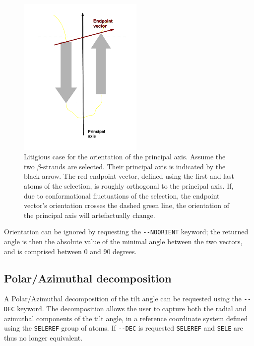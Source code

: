 \documentclass[11pt,twoside,onecolumn,a4paper,openright,notitlepage]{book}[2001/04/21]
\begin{document}
\begin{figure}[h]
\centering
\includegraphics[width=6cm]{images/error-beta-sheet.pdf}
\caption{Litigious case for the orientation of the principal axis. Assume the two $\beta$-strands are selected. Their principal axis is indicated by the black arrow. The red endpoint vector, defined using the first and last atoms of the selection, is roughly orthogonal to the principal axis. If, due to conformational fluctuations of the selection, the endpoint vector's orientation crosses the dashed green line, the orientation of the principal axis will artefactually change.} 
\label{fig:litigious-case-tilt}

\end{figure}

Orientation can be ignored by requesting the \verb!--NOORIENT! keyword; the returned angle is then the absolute value of the minimal angle between the two vectors, and is comprised between 0 and 90 degrees. 

\subsection*{Polar/Azimuthal decomposition}

A Polar/Azimuthal decomposition of the tilt angle can be requested using the \verb!--DEC! keyword. The decomposition allows the user to capture both the radial and azimuthal components of the tilt angle, in a reference coordinate system defined using the \verb!SELEREF! group of atoms. If \verb!--DEC! is requested \verb!SELEREF! and \verb!SELE! are thus no longer equivalent.
\end{document}
